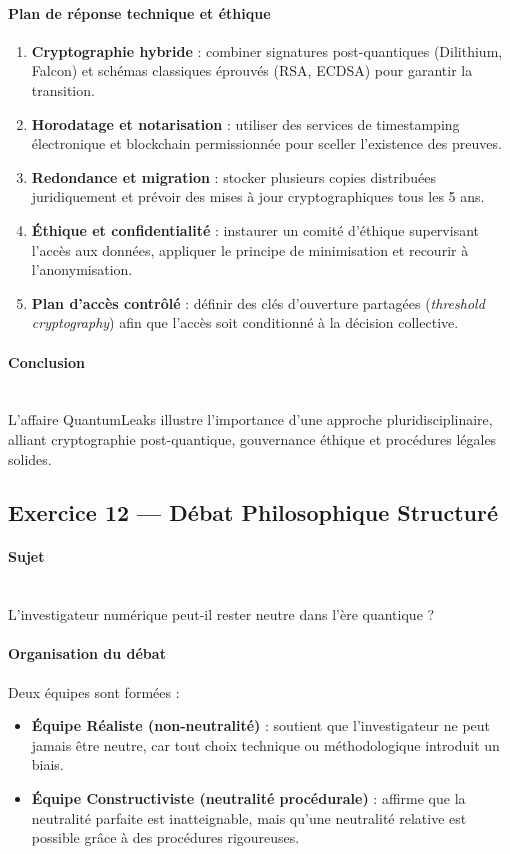 \documentclass[11pt]{article}
\begin{document}
\paragraph{Plan de réponse technique et éthique}
\begin{enumerate}
  \item \textbf{Cryptographie hybride} : combiner signatures post-quantiques (Dilithium, Falcon) et schémas classiques éprouvés (RSA, ECDSA) pour garantir la transition.
  \item \textbf{Horodatage et notarisation} : utiliser des services de timestamping électronique et blockchain permissionnée pour sceller l’existence des preuves.
  \item \textbf{Redondance et migration} : stocker plusieurs copies distribuées juridiquement et prévoir des mises à jour cryptographiques tous les 5 ans.
  \item \textbf{Éthique et confidentialité} : instaurer un comité d’éthique supervisant l’accès aux données, appliquer le principe de minimisation et recourir à l’anonymisation.
  \item \textbf{Plan d’accès contrôlé} : définir des clés d’ouverture partagées (\textit{threshold cryptography}) afin que l’accès soit conditionné à la décision collective.
\end{enumerate}

\paragraph{Conclusion}  \\
L’affaire \og QuantumLeaks \fg illustre l’importance d’une approche pluridisciplinaire, 
alliant cryptographie post-quantique, gouvernance éthique et procédures légales solides.

\subsection{Exercice 12 — Débat Philosophique Structuré}

\paragraph{Sujet}\\
\og L’investigateur numérique peut-il rester neutre dans l’ère quantique ? \fg

\paragraph{Organisation du débat}
Deux équipes sont formées :
\begin{itemize}
  \item \textbf{Équipe Réaliste (non-neutralité)} : soutient que l’investigateur ne peut jamais être neutre, car tout choix technique ou méthodologique introduit un biais.
  \item \textbf{Équipe Constructiviste (neutralité procédurale)} : affirme que la neutralité parfaite est inatteignable, mais qu’une neutralité relative est possible grâce à des procédures rigoureuses.
\end{itemize}
\end{document}
